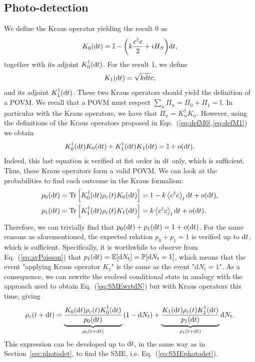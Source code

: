 \subsection{Photo-detection}
We define the Kraus operator yielding the result 0 as
\begin{equation}\label{eq:defM0}
    K_0(\mathrm{d}t)=\mathbb{I}-\qty(k\frac{c^\dagger c}{2}+i H_S)\mathrm{d}t,
\end{equation}
together with its adjoint $K_0^\dagger(\mathrm{d}t)$. For the result 1, we define
\begin{equation}\label{eq:defM1}
    K_1(\mathrm{d}t) = \sqrt{k\mathrm{d}t}c,
\end{equation}
and its adjoint $K_1^\dagger(\mathrm{d}t)$. These two Kraus operators should yield the definition of a POVM. We recall that a POVM must respect $\sum_n \Pi_n = \Pi_0+\Pi_1=\mathbb{I}$. In particular with the Kraus operators, we have that $\Pi_n=K_n^\dagger K_n$. However, using the definitions of the Kraus operators proposed in Eqs.~(\ref{eq:defM0},\ref{eq:defM1}) we obtain  
\begin{equation}
    K_0^\dagger(\mathrm{d}t) K_0(\mathrm{d}t) + K_1^\dagger(\mathrm{d}t) K_1(\mathrm{d}t) = \mathbb{I}+o(\mathrm{d}t).
\end{equation}
Indeed, this last equation is verified at fist order in $\mathrm{d}t$ only, which is sufficient. Thus, these Kraus operators form a valid POVM. We can look at the probabilities to find each outcome in the Kraus formalism:
\begin{align}
    p_0(\mathrm{d}t) &= \operatorname{Tr}\left[K_0^\dagger(\mathrm{d}t)\rho_c(t) K_0(\mathrm{d}t)\right] = 1-k\expval{c^\dagger c}_t\mathrm{d}t + o(\mathrm{d}t), \\
    p_1(\mathrm{d}t) &= \operatorname{Tr}\left[K_1^\dagger(\mathrm{d}t)\rho_c(t) K_1(\mathrm{d}t)\right] = k\expval{c^\dagger c}_t\mathrm{d}t + o(\mathrm{d}t).
\end{align}
Therefore, we can trivially find that $p_0(\mathrm{d}t)+p_1(\mathrm{d}t)=1+o(\mathrm{d}t)$. For the same reasons as aforementioned, the expected relation $p_0+p_1=1$ is verified up to $\mathrm{d}t$, which is sufficient. Specifically, it is worthwhile to observe from Eq.~(\ref{eq:avPoisson}) that $p_1(\mathrm{d}t) = \mathbb{E}\qty[\mathrm{d}N_t]=\mathbb{P}\qty[\mathrm{d}N_t=1]$, which means that the event "applying Kraus operator $K_1$" is the same as the event "$\mathrm{d}N_t=1$". As a consequence, we can rewrite the evolved conditional state in analogy with the approach used to obtain Eq.~(\ref{eq:SMEwrtdN}) but with Kraus operators this time, giving
\begin{equation}
    \rho_c(t+\mathrm{d}t) = \underbrace{\frac{K_0(\mathrm{d}t)\rho_c(t)K_0^\dagger(\mathrm{d}t)}{p_0(\mathrm{d}t)}}_{\rho_0(t+\mathrm{d}t)}\qty(1-\mathrm{d}N_t) + \underbrace{\frac{K_1(\mathrm{d}t)\rho_c(t)K_1^\dagger(\mathrm{d}t)}{p_1(\mathrm{d}t)}}_{\rho_1(t+\mathrm{d}t)}\mathrm{d}N_t.
\end{equation}
This expression can be developed up to $\mathrm{d}t$, in the same way as in Section~\ref{sec:photodet}, to find the SME, i.e. Eq.~(\ref{eq:SMEphotodet}).

